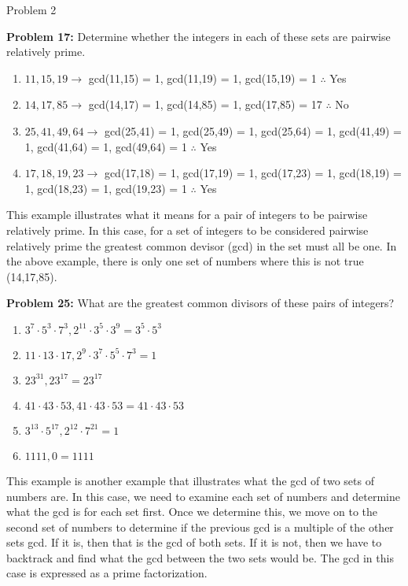 \begin{problem}{Problem 2}
\begin{highlight}[Solution]
        \noindent \textbf{Problem 17:} Determine whether the integers in each of these sets are pairwise relatively prime.

        \begin{enumerate}[label = (\alph*)]
            \item $11, 15, 19 \rightarrow$ gcd(11,15) = 1, gcd(11,19) = 1, gcd(15,19) = 1 $\therefore$ Yes
            \item $14, 17, 85 \rightarrow$ gcd(14,17) = 1, gcd(14,85) = 1, gcd(17,85) = 17 $\therefore$ No
            \item $25, 41, 49, 64 \rightarrow$ gcd(25,41) = 1, gcd(25,49) = 1, gcd(25,64) = 1, gcd(41,49) = 1, gcd(41,64) = 1, gcd(49,64) = 1 $\therefore$ Yes
            \item $17, 18, 19, 23 \rightarrow$ gcd(17,18) = 1, gcd(17,19) = 1, gcd(17,23) = 1, gcd(18,19) = 1, gcd(18,23) = 1, gcd(19,23) = 1 $\therefore$ Yes
        \end{enumerate}
        This example illustrates what it means for a pair of integers to be pairwise relatively prime. In this case, for a set of integers to be considered pairwise relatively prime the greatest 
        common devisor (gcd) in the set must all be one. In the above example, there is only one set of numbers where this is not true (14,17,85). \vspace*{1em}

        \noindent \textbf{Problem 25:} What are the greatest common divisors of these pairs of integers?

        \begin{enumerate}[label = (\alph*)]
            \item $3^{7} \cdot 5^{3} \cdot 7^{3}, 2^{11} \cdot 3^{5} \cdot 3^{9} = 3^{5} \cdot 5^{3}$
            \item $11 \cdot 13 \cdot 17, 2^{9} \cdot 3^{7} \cdot 5^{5} \cdot 7^{3} = 1$
            \item $23^{31} , 23^{17} = 23^{17}$
            \item $41 \cdot 43 \cdot 53, 41 \cdot 43 \cdot 53 = 41 \cdot 43 \cdot 53$
            \item $3^{13} \cdot 5^{17} , 2^{12} \cdot 7^{21} = 1$
            \item $1111,0 = 1111$
        \end{enumerate}
        This example is another example that illustrates what the gcd of two sets of numbers are. In this case, we need to examine each set of numbers and determine what the gcd is for each set first. 
        Once we determine this, we move on to the second set of numbers to determine if the previous gcd is a multiple of the other sets gcd. If it is, then that is the gcd of both sets. If it is not, 
        then we have to backtrack and find what the gcd between the two sets would be. The gcd in this case is expressed as a prime factorization. \vspace*{1em}


\end{highlight}
\end{problem}
